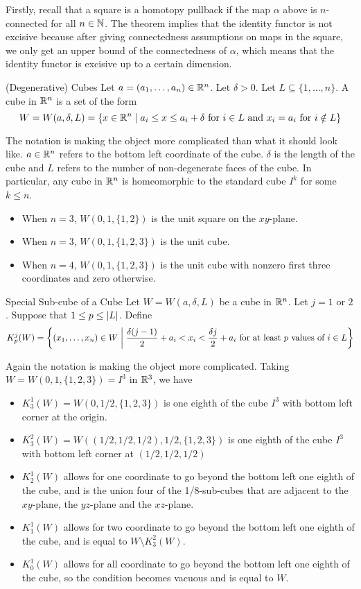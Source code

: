 \documentclass[a4paper]{article}
\begin{document}
Firstly, recall that a square is a homotopy pullback if the map $\alpha$ above is $n$-connected for all $n\in\mathbb{N}$. The theorem implies that the identity functor is not excisive because after giving connectedness assumptions on maps in the square, we only get an upper bound of the connectedness of $\alpha$, which means that the identity functor is excisive up to a certain dimension. 

\begin{defn}{(Degenerative) Cubes}{} Let $a=(a_1,\dots,a_n)\in\mathbb{R}^n$. Let $\delta>0$. Let $L\subseteq\{1,\dots,n\}$. A cube in $\mathbb{R}^n$ is a set of the form $$W=W(a,\delta,L)=\{x\in\mathbb{R}^n\;|\;a_i\leq x\leq a_i+\delta\text{ for }i\in L\text{ and }x_i=a_i\text{ for }i\notin L\}$$
\end{defn}

The notation is making the object more complicated than what it should look like. $a\in\mathbb{R}^n$ refers to the bottom left coordinate of the cube. $\delta$ is the length of the cube and $L$ refers to the number of non-degenerate faces of the cube. In particular, any cube in $\mathbb{R}^n$ is homeomorphic to the standard cube $I^k$ for some $k\leq n$. 
\begin{itemize}
\item When $n=3$, $W(0,1,\{1,2\})$ is the unit square on the $xy$-plane. 
\item When $n=3$, $W(0,1,\{1,2,3\})$ is the unit cube. 
\item When $n=4$, $W(0,1,\{1,2,3\})$ is the unit cube with nonzero first three coordinates and zero otherwise. 
\end{itemize}

\begin{defn}{Special Sub-cube of a Cube}{} Let $W=W(a,\delta,L)$ be a cube in $\mathbb{R}^n$. Let $j=1$ or $2$. Suppose that $1\leq p\leq\abs{L}$. Define $$K_p^j(W)=\left\{(x_1,\dots,x_n)\in W\;\bigg{|}\;\frac{\delta(j-1)}{2}+a_i<x_i<\frac{\delta j}{2}+a_i\text{ for at least }p\text{ values of }i\in L\right\}$$
\end{defn}

Again the notation is making the object more complicated. Taking $W=W(0,1,\{1,2,3\})=I^3$ in $\mathbb{R}^3$, we have 
\begin{itemize}
\item $K_3^1(W)=W(0,1/2,\{1,2,3\})$ is one eighth of the cube $I^3$ with bottom left corner at the origin. 
\item $K_3^2(W)=W((1/2,1/2,1/2),1/2,\{1,2,3\})$ is one eighth of the cube $I^3$ with bottom left corner at $(1/2,1/2,1/2)$
\item $K_2^1(W)$ allows for one coordinate to go beyond the bottom left one eighth of the cube, and is the union four of the 1/8-sub-cubes that are adjacent to the $xy$-plane, the $yz$-plane and the $xz$-plane. 
\item $K_1^1(W)$ allows for two coordinate to go beyond the bottom left one eighth of the cube, and is equal to $W\setminus K_3^2(W)$. 
\item $K_0^1(W)$ allows for all coordinate to go beyond the bottom left one eighth of the cube, so the condition becomes vacuous and is equal to $W$. 
\end{itemize}
\end{document}
